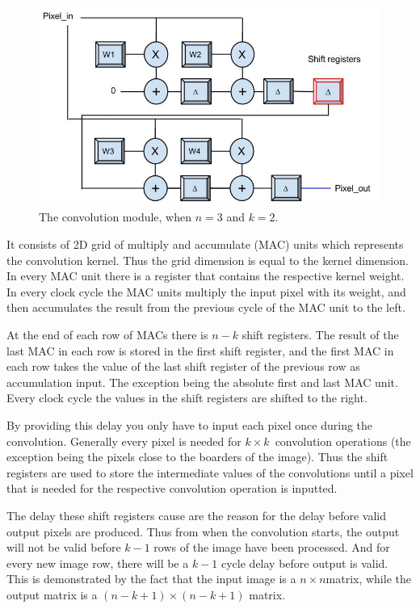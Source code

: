 \begin{figure}[h!]
  \centering
      \includegraphics[width=1.0\textwidth]{Figures/Method/Convolver}
  \caption{The convolution module, when $ n = 3 $ and $ k = 2 $.}
\end{figure}

It consists of 2D grid of multiply and accumulate (MAC) units which represents the convolution kernel. Thus the grid dimension is equal to the kernel dimension. In every MAC unit there is a register that contains the respective kernel weight. In every clock cycle the MAC units multiply the input pixel with its weight, and then accumulates the result from the previous cycle of the MAC unit to the left. 

At the end of each row of MACs there is $ n - k $ shift registers. The result of the last MAC in each row is stored in the first shift register, and the first MAC in each row takes the value of the last shift register of the previous row as accumulation input. The exception being the absolute first and last MAC unit. Every clock cycle the values in the shift registers are shifted to the right. 
	
By providing this delay you only have to input each pixel once during the convolution. Generally every pixel is needed for $ k \times k $ convolution operations (the exception being the pixels close to the boarders of the image). Thus the shift registers are used to store the intermediate values of the convolutions until a pixel that is needed for the respective convolution operation is inputted. 

The delay these shift registers cause are the reason for the delay before valid output pixels are produced. Thus from when the convolution starts, the output will not be valid before $ k-1 $ rows of the image have been processed. And for every new image row, there will be a $ k-1 $ cycle delay before output is valid. This is demonstrated by the fact that the input image is a $ n \times n $matrix, while the output matrix is a $ (n-k+1) \times (n-k+1) $ matrix. 

